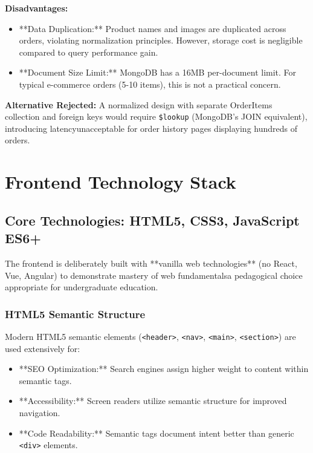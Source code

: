 \documentclass[12pt, a4paper]{report}
\begin{document}
\textbf{Disadvantages:}
\begin{itemize}
    \item **Data Duplication:** Product names and images are duplicated across orders, violating normalization principles. However, storage cost is negligible compared to query performance gain.
    \item **Document Size Limit:** MongoDB has a 16MB per-document limit. For typical e-commerce orders (5-10 items), this is not a practical concern.
\end{itemize}

\textbf{Alternative Rejected:} A normalized design with separate OrderItems collection and foreign keys would require \texttt{\$lookup} (MongoDB's JOIN equivalent), introducing latencyunacceptable for order history pages displaying hundreds of orders.

\section{Frontend Technology Stack}

\subsection{Core Technologies: HTML5, CSS3, JavaScript ES6+}

The frontend is deliberately built with **vanilla web technologies** (no React, Vue, Angular) to demonstrate mastery of web fundamentalsa pedagogical choice appropriate for undergraduate education.

\subsubsection{HTML5 Semantic Structure}

Modern HTML5 semantic elements (\texttt{<header>}, \texttt{<nav>}, \texttt{<main>}, \texttt{<section>}) are used extensively for:

\begin{itemize}
    \item **SEO Optimization:** Search engines assign higher weight to content within semantic tags.
    \item **Accessibility:** Screen readers utilize semantic structure for improved navigation.
    \item **Code Readability:** Semantic tags document intent better than generic \texttt{<div>} elements.
\end{itemize}
\end{document}
